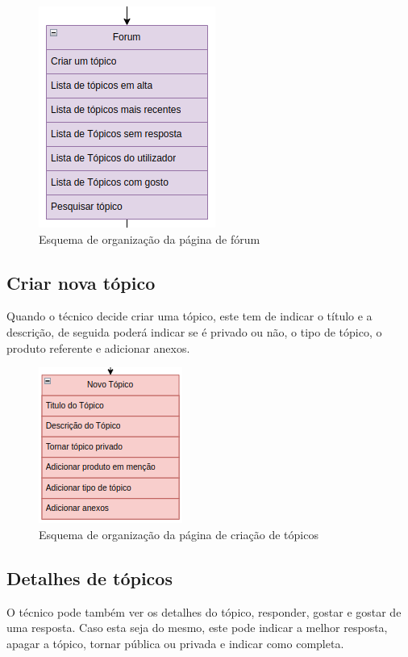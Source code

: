 \begin{figure}[htb]
  \centering
  
  \includegraphics[height=0.4\textwidth]{images/Arquiteturas/superficial_de_app/forum.png}
  \caption{Esquema de organização da página de fórum}
  \label{fig:5}
\end{figure}

\subsection{Criar nova tópico}

Quando o técnico decide criar uma tópico, este tem de indicar o título e a descrição, de seguida poderá indicar se é privado ou não, o tipo de tópico, o produto referente e adicionar anexos.

\begin{figure}[htb]
  \centering
  
  \includegraphics[height=0.3\textwidth]{images/Arquiteturas/superficial_de_app/criar_topico.png}
  \caption{Esquema de organização da página de criação de tópicos}
  \label{fig:6}
\end{figure}

\newpage

\subsection{Detalhes de tópicos}

O técnico pode também ver os detalhes do tópico, responder, 
gostar e gostar de uma resposta.
Caso esta seja do mesmo, este pode indicar a melhor resposta, apagar a tópico, tornar pública ou privada e indicar como completa.

